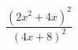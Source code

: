 \begin{ex}[type=expression]
	\begin{condition}
		\(\dfrac{(2x^2+4x)^2}{(4x+8)^2}\)
	\end{condition}
\end{ex}